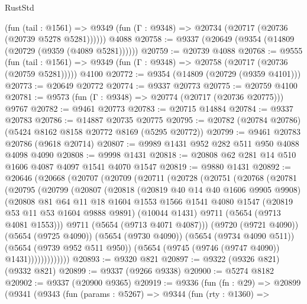 \begin{lexlean}{RustStd}
\begin{coremodule}
      (fun (tail : @1561) =>
      @9349 (fun (Γ : @9348) => @20734 (@20717 (@20736 (@20739 @5278 @5281))))))
    @4088
@20758 := @9337 (@20649 (@9354 (@14809 (@20729 (@9359 (@4089 @5281))))))
@20759 := @20739 @4088
@20768 := @9555
    (fun (tail : @1561) => @9349 (fun (Γ : @9348) => @20758 (@20717 (@20736 (@20759 @5281)))))
    @4100
@20772 := @9354 (@14809 (@20729 (@9359 @4101)))
@20773 := @20649 @20772
@20774 := @9337 @20773
@20775 := @20759 @4100
@20781 := @9573 (fun (Γ : @9348) => @20774 (@20717 (@20736 @20775))) @9767
@20782 := @9461 @20773
@20783 := @20715 @14884
@20784 := @9337 @20783
@20786 := @14887 @20735 @20775
@20795 := @20782 (@20784 @20786) (@5424 @8162 @8158 @20772 @8169 (@5295 @20772))
@20799 := @9461 @20783 @20786 (@9618 @20714)
@20807 := @9989 @1431 @952 @282 @511 @950 @4088 @4098 @4090
@20808 := @9998 @1431
@20818 := @20808 @62 @281 @14 @510 @1606 @4087 @4097 @1541 @4070 @1547
@20819 := @9880 @1431
@20892 := @20646
    (@20668
      (@20707
        (@20709
          (@20711
            (@20728
              (@20751
                (@20768
                  (@20781
                    (@20795
                      (@20799
                        (@20807
                          (@20818
                            (@20819 @40 @14 @40 @1606 @9905 @9908)
                            (@20808
                              @81
                              @64
                              @11
                              @18
                              @1604
                              @1553
                              @1566
                              @1541
                              @4080
                              @1547
                              (@20819 @53 @11 @53 @1604 @9888 @9891)
                              (@10044 @1431)
                              @9711
                              (@5654 (@9713 @4081 @1553)))
                            @9711
                            (@5654 (@9713 @4071 @4087)))
                          (@9720 (@9721 @4090))
                          (@5654 (@9725 @4090))
                          (@5654 (@9730 @4090))
                          (@5654 (@9734 @4090 @511))
                          (@5654 (@9739 @952 @511 @950))
                          (@5654 (@9745 (@9746 (@9747 @4090)) @1431)))))))))))))
@20893 := @9320 @821
@20897 := @9322 (@9326 @821) (@9332 @821)
@20899 := @9337 (@9266 @9338)
@20900 := @5274 @8182
@20902 := @9337 (@20900 @9365)
@20919 := @9336
    (fun (fn : @29) =>
    @20899
      (@9341
        (@9343
          (fun (params : @5267) =>
          @9344
            (fun (rty : @1360) =>

\end{coremodule}
\end{lexlean}
